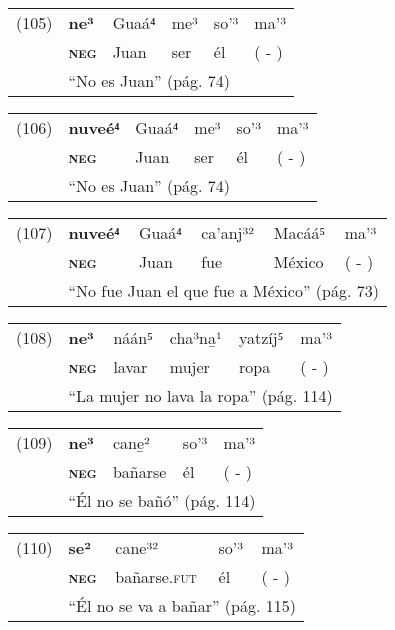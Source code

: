 {\setmainfont{Charis SIL} 

\begin{tabular}{llllll}
(105) & \textbf{ne³} & Guaá⁴ & me³ & so'³ & ma'³ \\
& \textsc{\textbf{neg}} & Juan & ser & él & ( - ) \\
& \multicolumn{5}{l}{``No es Juan'' (pág. 74)}
\end{tabular} \vspace{0.2cm}

\begin{tabular}{llllll}
(106) & \textbf{nuveé⁴} & Guaá⁴ & me³ & so'³ & ma'³ \\
& \textsc{\textbf{neg}} & Juan & ser & él & ( - ) \\
& \multicolumn{5}{l}{``No es Juan'' (pág. 74)}
\end{tabular} \vspace{0.2cm}

\begin{tabular}{llllll}
(107) & \textbf{nuveé⁴} & Guaá⁴ & ca'anj³² & Macáá⁵ & ma'³ \\
& \textsc{\textbf{neg}} & Juan & fue & México & ( - ) \\
& \multicolumn{5}{l}{``No fue Juan el que fue a México'' (pág. 73)} 
\end{tabular} \vspace{0.2cm}

\begin{tabular}{llllll}
(108) & \textbf{ne³} & náán⁵ & cha³na̱¹ & yatzíj⁵ & ma'³ \\
& \textsc{\textbf{neg}} & lavar & mujer &  ropa & ( - ) \\
& \multicolumn{5}{l}{``La mujer no lava la ropa'' (pág. 114)}
\end{tabular} \vspace{0.2cm}

\begin{tabular}{lllll}
(109) & \textbf{ne³} & cane̱² & so'³ & ma'³ \\
& \textsc{\textbf{neg}} & bañarse & él & ( - ) \\
& \multicolumn{4}{l}{``Él no se bañó'' (pág. 114)}
\end{tabular} \vspace{0.2cm}

\begin{tabular}{lllll}
(110) & \textbf{se²} & cane³² & so'³ & ma'³ \\
& \textsc{\textbf{neg}} & bañarse.\textsc{fut} & él & ( - ) \\
& \multicolumn{4}{l}{``Él no se va a bañar'' (pág. 115)}
\end{tabular} \vspace{0.3cm}

}

